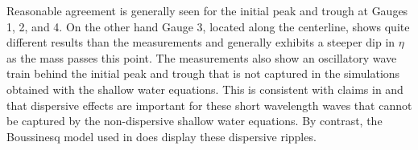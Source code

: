 Reasonable agreement is generally seen for the initial peak and trough at 
Gauges 1, 2, and 4.  On the other hand 
Gauge 3, located along the centerline, shows quite
different results than the measurements and generally exhibits a steeper dip
in $\eta$ as the mass passes this point.   The measurements also show an
oscillatory wave train behind the initial peak and trough that is not
captured in the simulations obtained with the shallow water equations.  This
is consistent with claims in \cite{bp-description} and \cite{EnetGrilli}
that dispersive effects are important for these short wavelength waves that
cannot be captured by the non-dispersive shallow water equations.  By
contrast, the Boussinesq model used in \cite{??} does display these
dispersive ripples.




\begin{figure}[ht]


\end{figure}
